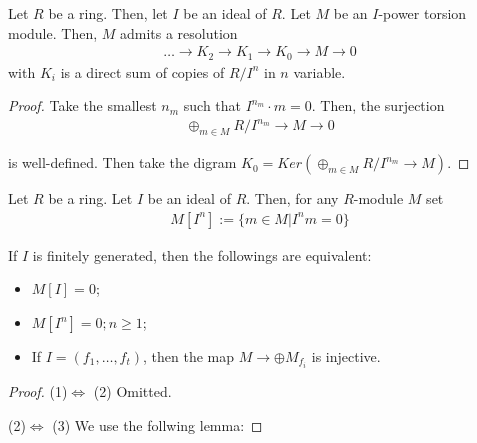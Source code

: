 \documentclass[Total.tex]{subfiles}
\begin{document}
				\begin{lemma}
					Let $R$ be a ring. Then, let $I$ be an ideal of $R$. Let $M$ be an $I$-power torsion module. Then, $M$ admits a resolution
					\begin{gather*}
						\dots\rightarrow K_2\rightarrow K_1\rightarrow K_0\rightarrow M\rightarrow 0
					\end{gather*}
					with $K_i$ is a direct sum of copies of $R/I^n$ in $n$ variable.
				\end{lemma}
				\begin{proof}
					Take the smallest $n_m$ such that $I^{n_m}\cdot m=0$. Then, the surjection
					\begin{gather*}
						\oplus_{m\in M}R/I^{n_m}\rightarrow M\rightarrow 0
					\end{gather*}
					
					is well-defined. Then take the digram $K_0=Ker(\oplus_{m\in M}R/I^{n_m}\rightarrow M)$.  
				\end{proof}
				
				\begin{proposition}
					Let $R$ be a ring. Let $I$ be an ideal of $R$. Then, for any $R$-module $M$ set
					\begin{gather*}
						M[I^n]:= \{m\in M|I^nm=0\}
					\end{gather*}
					
					If $I$ is finitely generated, then the followings are equivalent:
					\begin{itemize}
						\item $M[I]=0$;
						\item $M[I^n]=0;n\geq 1$;
						\item If $I=(f_1,\dots,f_t)$, then the map $M\rightarrow \oplus M_{f_i}$ is injective.
					\end{itemize}
				\end{proposition}
				\begin{proof}
					(1)$\Leftrightarrow $ (2) Omitted.
					
					(2)$\Leftrightarrow$ (3) We use the follwing lemma:
				\end{proof}
				
\end{document}
